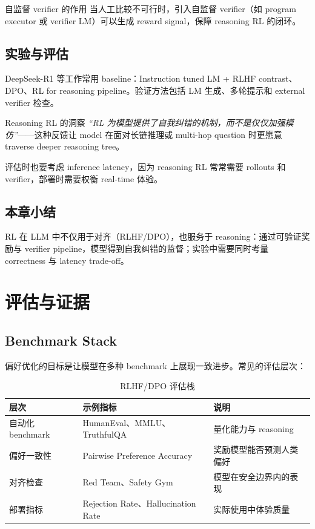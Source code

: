 \documentclass[a4paper]{article}
\begin{document}
\begin{knowledgebox}{自监督 verifier 的作用}
当人工比较不可行时，引入自监督 verifier（如 program executor 或 verifier LM）可以生成 reward signal，保障 reasoning RL 的闭环。
\end{knowledgebox}

\subsection{实验与评估}

DeepSeek-R1 等工作常用 baseline：Instruction tuned LM + RLHF contrast、DPO、RL for reasoning pipeline。验证方法包括 LM 生成、多轮提示和 external verifier 检查。

\begin{importantbox}{Reasoning RL 的洞察}
\textit{``RL 为模型提供了自我纠错的机制，而不是仅仅加强模仿''}——这种反馈让 model 在面对长链推理或 multi-hop question 时更愿意 traverse deeper reasoning tree。
\end{importantbox}

评估时也要考虑 inference latency，因为 reasoning RL 常常需要 rollouts 和 verifier，部署时需要权衡 real-time 体验。

\subsection{本章小结}

RL 在 LLM 中不仅用于对齐（RLHF/DPO），也服务于 reasoning：通过可验证奖励与 verifier pipeline，模型得到自我纠错的监督；实验中需要同时考量 correctness 与 latency trade-off。

\section{评估与证据}

\subsection{Benchmark Stack}

偏好优化的目标是让模型在多种 benchmark 上展现一致进步。常见的评估层次：

\begin{table}[H]
\centering
\begin{tabular}{p{} p{} p{}}
\toprule
层次 & 示例指标 & 说明 \\
\midrule
自动化 benchmark & HumanEval、MMLU、TruthfulQA & 量化能力与 reasoning \\
偏好一致性 & Pairwise Preference Accuracy & 奖励模型能否预测人类偏好 \\
对齐检查 & Red Team、Safety Gym & 模型在安全边界内的表现 \\
部署指标 & Rejection Rate、Hallucination Rate & 实际使用中体验质量 \\
\bottomrule
\end{tabular}
\caption{RLHF/DPO 评估栈}
\end{table}
\end{document}
